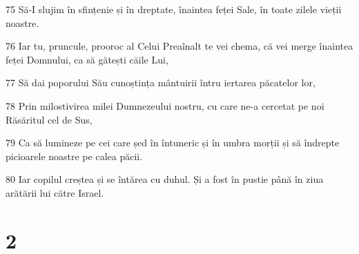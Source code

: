\par 75 Să-I slujim în sfințenie și în dreptate, înaintea feței Sale, în toate zilele vieții noastre.
\par 76 Iar tu, pruncule, prooroc al Celui Preaînalt te vei chema, că vei merge înaintea feței Domnului, ca să gătești căile Lui,
\par 77 Să dai poporului Său cunoștința mântuirii întru iertarea păcatelor lor,
\par 78 Prin milostivirea milei Dumnezeului nostru, cu care ne-a cercetat pe noi Răsăritul cel de Sus,
\par 79 Ca să lumineze pe cei care șed în întuneric și în umbra morții și să îndrepte picioarele noastre pe calea păcii.
\par 80 Iar copilul creștea și se întărea cu duhul. Și a fost în pustie până în ziua arătării lui către Israel.

\chapter{2}

